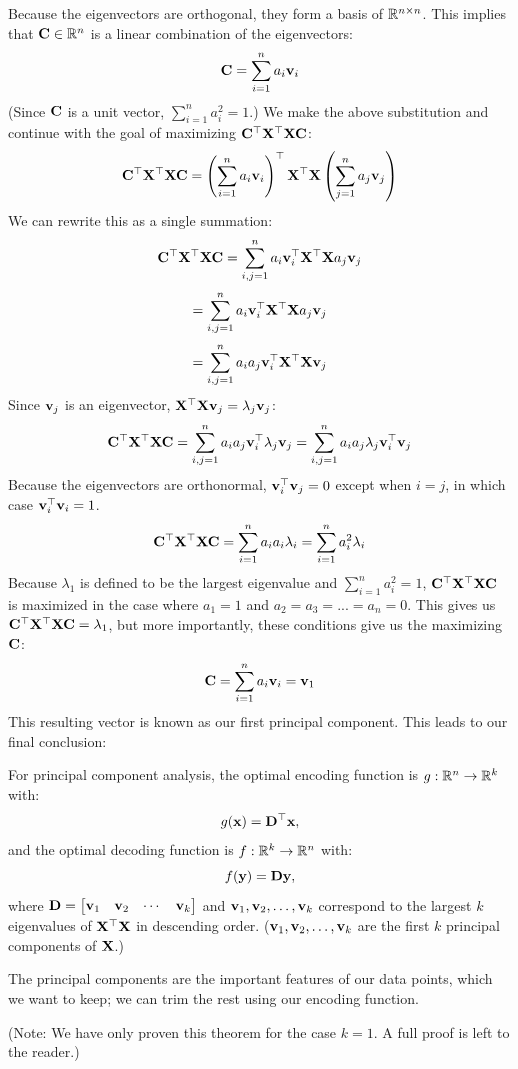 Because the eigenvectors are orthogonal, they form a basis of $\R^{n \times n}$.  This implies that $\MC \in \R^n$ is a linear combination of the eigenvectors:
$$\MC = \sum^n_{i=1} a_i\vv_i$$
(Since $\MC$ is a unit vector, $\sum^n_{i=1} a^2_i = 1$.)  We make the above substitution and continue with the goal of maximizing $\MC^\top\MX^\top\MX\MC$:
$$\MC^\top\MX^\top\MX\MC = \left(\sum^n_{i=1} a_i\vv_i\right)^\top\MX^\top\MX\left(\sum^n_{j=1} a_j\vv_j\right)$$
We can rewrite this as a single summation:
$$\MC^\top\MX^\top\MX\MC = \sum^n_{i,j=1} a_i\vv^\top_i\MX^\top\MX a_j\vv_j$$
$$= \sum^n_{i,j=1} a_i\vv^\top_i\MX^\top\MX a_j\vv_j$$
$$= \sum^n_{i,j=1} a_ia_j\vv^\top_i\MX^\top\MX \vv_j$$
Since $\vv_j$ is an eigenvector, $\MX^\top\MX \vv_j = \lambda_j\vv_j$:
$$\MC^\top\MX^\top\MX\MC = \sum^n_{i,j=1} a_ia_j\vv^\top_i\lambda_j\vv_j = \sum^n_{i,j=1} a_ia_j\lambda_j\vv^\top_i\vv_j$$
Because the eigenvectors are orthonormal, $\vv^\top_i\vv_j = 0$ except when $i = j$, in which case $\vv_i^\top\vv_i = 1$.
$$\MC^\top\MX^\top\MX\MC = \sum^n_{i=1} a_ia_i\lambda_i = \sum^n_{i=1} a^2_i\lambda_i$$
Because $\lambda_1$ is defined to be the largest eigenvalue and $\sum^n_{i=1} a^2_i = 1$, $\MC^\top\MX^\top\MX\MC$ is maximized in the case where $a_1 = 1$ and $a_2 = a_3 = ... = a_n = 0$.  This gives us $\MC^\top\MX^\top\MX\MC = \lambda_1$, but more importantly, these conditions give us the maximizing $\MC$:
$$\MC = \sum^n_{i=1} a_i\vv_i = \vv_1$$
This resulting vector is known as our first principal component.  This leads to our final conclusion:
\begin{theorem}
    For principal component analysis, the optimal encoding function is $g : \R^n \to \R^k$ with:
    $$g(\vx) = \MD^\top\vx,$$
    and the optimal decoding function is $f : \R^k \to \R^n$ with:
    $$f(\vy) = \MD\vy,$$
    where $\MD = \begin{bmatrix} \vv_1 & \vv_2 & \cdots & \vv_k \end{bmatrix}$ and $\vv_1, \vv_2, \ldots, \vv_k$ correspond to the largest $k$ eigenvalues of $\MX^\top\MX$ in descending order.  ($\vv_1, \vv_2, \ldots, \vv_k$ are the first $k$ principal components of $\MX$.)
\end{theorem}
The principal components are the important features of our data points, which we want to keep; we can trim the rest using our encoding function.

(Note: We have only proven this theorem for the case $k = 1$.  A full proof is left to the reader.)


